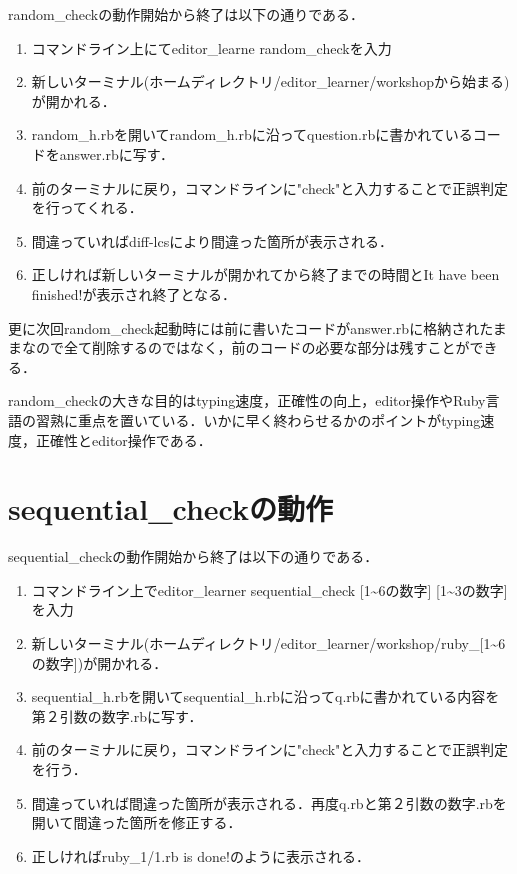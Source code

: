 random\_checkの動作開始から終了は以下の通りである．

\begin{enumerate}
\def\labelenumi{\arabic{enumi}.}
\tightlist
\item
  コマンドライン上にてeditor\_learne random\_checkを入力
\item
  新しいターミナル(ホームディレクトリ/editor\_learner/workshopから始まる)が開かれる．
\item
  random\_h.rbを開いてrandom\_h.rbに沿ってquestion.rbに書かれているコードをanswer.rbに写す．
\item
  前のターミナルに戻り，コマンドラインに"check"と入力することで正誤判定を行ってくれる．
\item
  間違っていればdiff-lcsにより間違った箇所が表示される．
\item
  正しければ新しいターミナルが開かれてから終了までの時間とIt have been
  finished!が表示され終了となる．
\end{enumerate}

更に次回random\_check起動時には前に書いたコードがanswer.rbに格納されたままなので全て削除するのではなく，前のコードの必要な部分は残すことができる．

random\_checkの大きな目的はtyping速度，正確性の向上，editor操作やRuby言語の習熟に重点を置いている．いかに早く終わらせるかのポイントがtyping速度，正確性とeditor操作である．

    \section{sequential\_checkの動作}\label{sequential_checkux306eux52d5ux4f5c}

    sequential\_checkの動作開始から終了は以下の通りである．

\begin{enumerate}
\def\labelenumi{\arabic{enumi}.}
\tightlist
\item
  コマンドライン上でeditor\_learner sequential\_check
  {[}1\textasciitilde{}6の数字{]} {[}1\textasciitilde{}3の数字{]}を入力
\item
  新しいターミナル(ホームディレクトリ/editor\_learner/workshop/ruby\_{[}1\textasciitilde{}6の数字{]})が開かれる．
\item
  sequential\_h.rbを開いてsequential\_h.rbに沿ってq.rbに書かれている内容を第２引数の数字.rbに写す．
\item
  前のターミナルに戻り，コマンドラインに"check"と入力することで正誤判定を行う．
\item
  間違っていれば間違った箇所が表示される．再度q.rbと第２引数の数字.rbを開いて間違った箇所を修正する．
\item
  正しければruby\_1/1.rb is done!のように表示される．
\end{enumerate}

